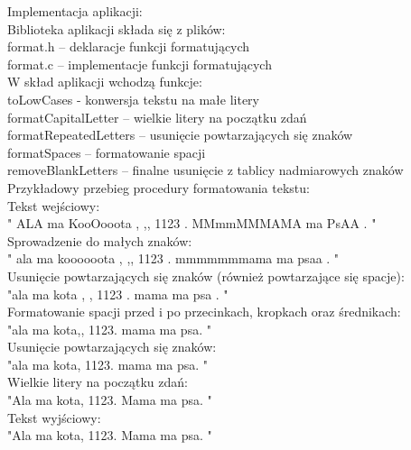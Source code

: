 \documentclass[a4paper,titlepage,11pt,floatssmall]{mwrep}
\begin{document}
Implementacja aplikacji: \\
	Biblioteka aplikacji składa się z plików:\\
	\indent{}format.h – deklaracje funkcji formatujących\\
	\indent{}format.c – implementacje funkcji formatujących\\
	\medskip
W skład aplikacji wchodzą funkcje:\\
	\indent{}toLowCases	- konwersja tekstu na małe litery\\
	\indent{}formatCapitalLetter – wielkie litery na początku zdań\\
	\indent{}formatRepeatedLetters – usunięcie powtarzających się znaków\\
	\indent{}formatSpaces – formatowanie spacji\\
	\indent{}removeBlankLetters – finalne usunięcie z tablicy nadmiarowych znaków\\
\medskip
Przykładowy przebieg procedury formatowania tekstu:\\
Tekst wejściowy: \\
"   ALA ma KooOooota  ,  ,,  1123   .      MMmmMMMAMA ma PsAA .  "\\
Sprowadzenie do małych znaków:\\
"   ala ma koooooota  ,  ,,  1123   .      mmmmmmmama ma psaa .  "\\
Usunięcie powtarzających się znaków (również powtarzające się spacje):\\
"ala ma kota , , 1123 . mama ma psa .  "\\
Formatowanie spacji przed i po przecinkach, kropkach oraz średnikach:\\
"ala ma kota,, 1123. mama ma psa.  "\\
Usunięcie powtarzających się znaków:\\
"ala ma kota, 1123. mama ma psa.  "\\
Wielkie litery na początku zdań:\\
"Ala ma kota, 1123. Mama ma psa.  "\\
Tekst wyjściowy: \\
"Ala ma kota, 1123. Mama ma psa.  "\\
\end{document}
